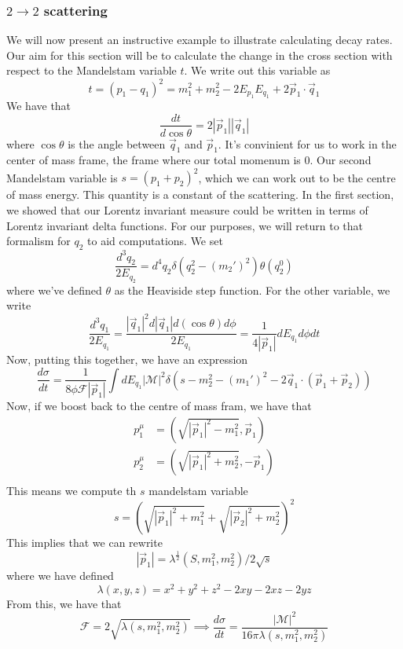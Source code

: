 \subsubsection{$ 2 \to 2 $ scattering}
We will now present an instructive 
example to illustrate calculating 
decay rates. Our aim for this section will be to 
calculate the change in the cross section with respect to 
the Mandelstam variable $ t $. 
We write out this variable as 
\[
	t =  ( p_1 - q_1) ^ 2 = m_1 ^ 2 + m_2 ^ 2 - 2 E_{ p _ 1 } E _{ q _ 1 } + 2 
	\vec{p} _ 1 \cdot  \vec{q} _ 1 
\] We have that 
\[
\frac{ d t }{ d \cos \theta } = 2 | \vec{p} _ 1 | | \vec{q} _ 1 | 
\] where  $ \cos \theta $ is the angle between $ \vec{q}  _ 1 $ and $ \vec{p} _ 1 $. 
It's convinient for us to work in the center of mass frame, 
the frame where our total momenum is $ 0 $. 
Our second Mandelstam variable is 
$ s= ( p_1 + p_2 ) ^ 2 $, which we can work out to be the centre 
of mass energy. This quantity is a constant of the scattering. 
In the first section, we showed that our Lorentz invariant measure 
could be written in terms of Lorentz invariant delta functions. 
For our purposes, we will return to that formalism for $ q_2  $ 
to aid computations. We set 
\[
	\frac{ d ^ 3 q_2 }{ 2 E _{ q_ 2 } } = d ^ 4 q _ 2 \delta ( q_2 ^ 2 - ( m_2 ') ^ 2 ) \theta ( q_2 ^ 0 ) 
\] where we've defined $ \theta $ as the Heaviside step function. 
For the other variable, we write
\[
	\frac{ d ^ 3 q_1 }{ 2 E _{ q_1 } } = \frac{ | \vec{q} _ 1 | ^ 2 d | \vec{q} _1 | d ( \cos \theta ) 
	d \phi }{ 2 E_{ q_{1 } }} = \frac{1}{ 4 | \vec{p} _ 1 | } d E_{ q_ 1 } d \phi dt 
\] Now, putting this together, 
we have an expression 
\[
 \frac{ d \sigma }{ dt } = \frac{1}{8 \phi \mathcal{ F } | \vec{p}_ 1  | } 
 \int d E_{ q_ 1 } | \mathcal{ M } | ^ 2 \delta ( s - m_2 ^ 2  -  ( m_1')  ^ 2 - 2 \vec{q} _ 1 
 \cdot  ( \vec{p} _ 1 + \vec{p} _ 2 ) ) 
\] Now, if we boost back to the centre of mass fram, we have that 
\begin{align*}
	p_1 ^\mu & = ( \sqrt{| \vec{p} _ 1 | ^  2 - m_1 ^ 2 }, \vec{p} _ 1 )  \\
	p_2 ^ \mu &=  ( \sqrt{ | \vec{p} _ 1 | ^ 2 + m_2 ^ 2 }, - \vec{p} _ 1 )   \\
\end{align*}
This means we compute th $ s $ mandelstam variable 
\[
	s = ( \sqrt{ | \vec{p} _1 | ^ 2 + m_1 ^ 2  } + \sqrt{ | \vec{p} _ 2 |^ 2 + m_2 ^ 2  } ) ^ 2  
\] This implies that we can rewrite 
\[
	| \vec{p} _ 1 | = \lambda ^{ \frac{1}{2 } } ( S, m_1 ^ 2 , m_2 ^ 2 ) / 2 \sqrt{ s }  
\] where we have defined 
\[
 \lambda ( x, y , z ) = x^ 2 + y ^ 2 + z ^ 2 - 2xy - 2xz - 2yz
\] From this, we have that 
\[
	\mathcal{ F } = 2 \sqrt{ \lambda ( s , m_1 ^ 2 , m_2 ^ 2 ) } \implies 
	\frac{ d \sigma }{ d t } = \frac{ | \mathcal{ M } | ^ 2 }{ 16 \pi \lambda ( s , m_1 ^ 2 , m_2 ^ 2 ) }
\] 
